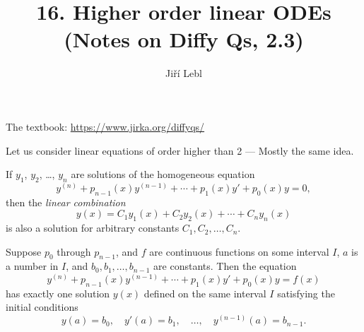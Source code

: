 \documentclass[10pt,aspectratio=169]{beamer}
\author{Ji\v{r}\'i Lebl}
\institute[OSU]{%
Oklahoma State University%
}
\title{16. Higher order linear ODEs\\(Notes on Diffy Qs, 2.3)}
\date{}
\begin{document}
\begin{frame}
\titlepage


\begin{center}
The textbook: \url{https://www.jirka.org/diffyqs/}
\end{center}
\end{frame}

\begin{frame}
Let us consider linear equations of order higher than 2 --- Mostly the same
idea.

\pause

\begin{theorem}[Superposition]
If $y_1$, $y_2$, \ldots, $y_n$ are solutions of the
homogeneous equation
\[
y^{(n)} + p_{n-1}(x)y^{(n-1)} + \cdots + p_1(x) y' + p_0(x) y = 0 ,
\]
then the \emph{linear combination}
\[
y(x) = C_1 y_1(x) + C_2 y_2(x) + \cdots + C_n y_n(x) 
\]
is also a solution
for arbitrary constants $C_1, C_2, \ldots, C_n$.
\end{theorem}

\end{frame}

\begin{frame}

\begin{theorem}
Suppose $p_0$ through $p_{n-1}$, and $f$ are continuous functions
on some interval $I$,
$a$ is a number in $I$,
and $b_0, b_1, \ldots, b_{n-1}$ are constants.
Then the equation
\[
y^{(n)} + p_{n-1}(x)y^{(n-1)} + \cdots + p_1(x) y' + p_0(x) y = f(x) 
\]
has exactly one solution $y(x)$ defined on the same interval $I$
satisfying the initial conditions
\begin{equation*}
y(a) = b_0, \quad y'(a) = b_1, \quad \ldots, \quad y^{(n-1)}(a) = b_{n-1} .
\end{equation*}
\end{theorem}
\end{frame}
\end{document}
